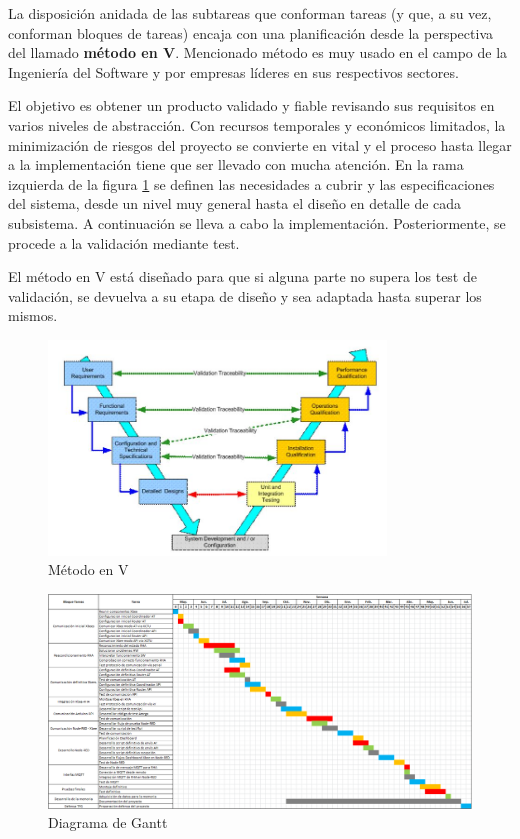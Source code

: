 La disposición anidada de las subtareas que conforman tareas (y que, a su vez, conforman bloques de tareas) encaja con una planificación desde la perspectiva del llamado \textbf{método en V}. Mencionado método es muy usado en el campo de la Ingeniería del Software y por empresas líderes en sus respectivos sectores.

El objetivo es obtener un producto validado y fiable revisando sus requisitos en varios niveles de abstracción. Con recursos temporales y económicos limitados, la minimización de riesgos del proyecto se convierte en vital y el proceso hasta llegar a la implementación tiene que ser llevado con mucha atención. En la rama izquierda de la figura \ref{fig:v} se definen las necesidades a cubrir y las especificaciones del sistema, desde un nivel muy general hasta el diseño en detalle de cada subsistema. A continuación se lleva a cabo la implementación. Posteriormente, se procede a la validación mediante test.

El método en V está diseñado para que si alguna parte no supera los test de validación, se devuelva a su etapa de diseño y sea adaptada hasta superar los mismos.

\begin{figure}[H]
	\centering
   	\includegraphics[width=0.8\textwidth]{figuras/v.png}
   	\caption{Método en V}
   	\label{fig:v}
\end{figure}

\begin{landscape}
   	\begin{figure}[H]
   		\centering
   		\includegraphics[width=1.6\textwidth]{figuras/Gantt.png}
   		\caption{Diagrama de Gantt}
   		\label{fig:gantt}
   	\end{figure}
\end{landscape}

